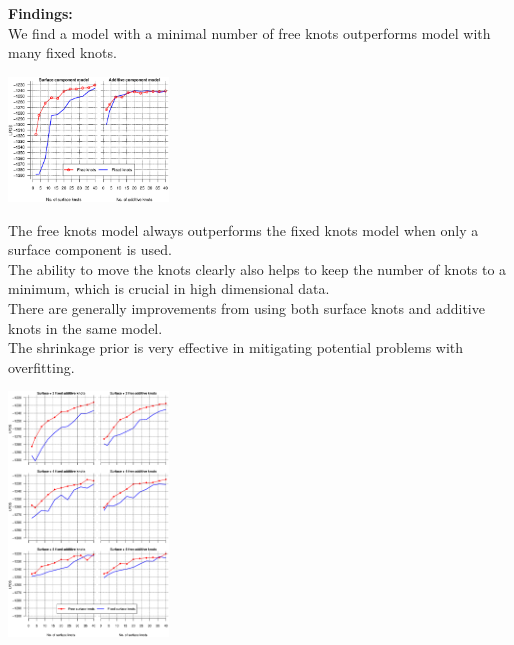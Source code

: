 \documentclass[a0paper,portrait,fontscale = 0.32,margin=1.5em]{baposter/baposter}
\begin{document}
\begin{poster}
{\begin{multicols}{3}
{\color{red} \textbf{Findings:\\}}
  {\smaller {\color{red} $\bullet$} We find a model with a minimal number of free knots outperforms
  model with many fixed knots.}

\newpage
    \includegraphics[width=0.32\textwidth]{RajanLPDS_SurfaceBesideAdditive}

{\smaller {\color{red} $\bullet$}
The free knots model always outperforms the fixed knots model when only
a surface component is used.\\
}
{\smaller {\color{red} $\bullet$}
The ability to
move the knots clearly also helps to keep the number of knots to a minimum,
which is crucial in high dimensional data.\\
}
{\smaller {\color{red} $\bullet$}
There are generally
improvements from using both surface knots and additive knots in the same
model.\\
}
{\smaller {\color{red} $\bullet$}
The shrinkage prior is very effective in
mitigating potential problems with overfitting.\\
}

\newpage \includegraphics[width=0.32\textwidth]{RajanLPDS_SurfacePlusAdditive}


\end{multicols}}
\end{poster}
\end{document}
